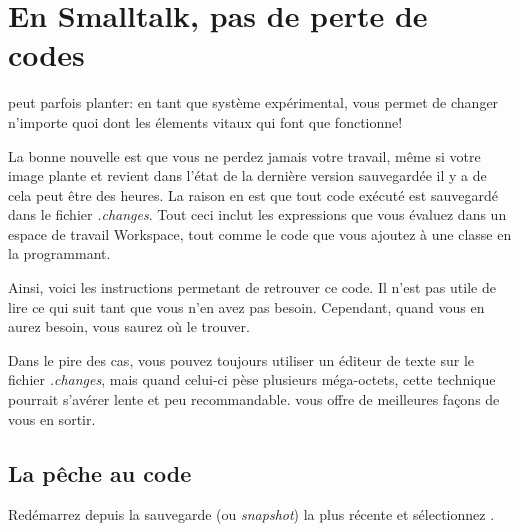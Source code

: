 \documentclass[a4paper,10pt,twoside]{book}
\begin{document}
\section{En Smalltalk, pas de perte de codes}

\pharo peut parfois planter: en tant que système expérimental, \pharo vous permet
de changer n'importe quoi dont les élements vitaux qui font que \pharo fonctionne!


La bonne nouvelle est que vous ne perdez jamais votre travail, même si votre 
image plante et revient dans l'état de la dernière version sauvegardée il y 
a de cela peut être des heures.
La raison en est que tout code exécuté est sauvegardé dans le fichier
\emph{.changes}.
Tout ceci inclut les expressions que vous évaluez dans un espace de travail Workspace,
tout comme le code que vous ajoutez à une classe en la programmant.

Ainsi, voici les instructions permetant de retrouver ce code.
Il n'est pas utile de lire ce qui suit tant que vous n'en avez pas besoin.
Cependant, quand vous en aurez besoin, vous saurez où le trouver.

Dans le pire des cas, vous pouvez toujours utiliser un éditeur de texte
sur le fichier \emph{.changes}, mais quand celui-ci pèse plusieurs méga-octets,
cette technique pourrait s'avérer lente et peu recommandable.
\pharo vous offre de meilleures façons de vous en sortir.

\subsection{La pêche au code}

Redémarrez \pharo depuis la sauvegarde (ou \emph{snapshot}) la plus récente et
sélectionnez . 

\end{document}
